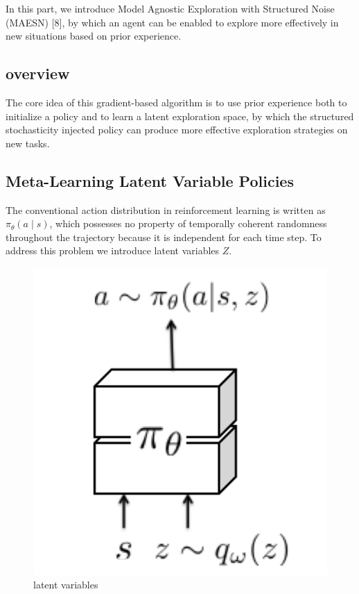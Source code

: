 In this part, we introduce Model Agnostic Exploration with Structured Noise (MAESN) [8], by which an agent can be enabled to explore more effectively in new situations based on prior experience.
\subsection{overview}

The core idea of this gradient-based algorithm is to use prior experience both to initialize a policy and to learn a latent exploration space, by which the structured stochasticity injected policy can produce more effective exploration strategies on new tasks.

\subsection{ Meta-Learning Latent Variable Policies}
The conventional action distribution in reinforcement learning is written as $\pi_{\theta}(a \mid s)$, which possesses no property of temporally coherent randomness throughout the trajectory because it is independent for each time step. To address this problem we introduce latent variables $Z$. 
\begin{figure}[H]
	\includegraphics[scale=0.6]{MAESN_01.PNG}
	\centering
	\caption{latent variables}
	\label{MAESN}
\end{figure}

